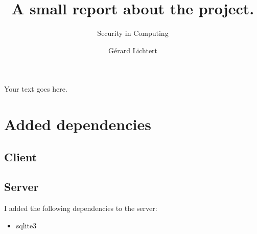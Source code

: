\documentclass{article}
\title{A small report about the project.}
\subtitle{Security in Computing}
\author{Gérard Lichtert}
\begin{document}
\maketitle

Your text goes here.


\tableofcontents

\section*{Added dependencies}
\subsection*{Client}
\subsection*{Server}
I added the following dependencies to the server:
\begin{itemize}
    \item sqlite3
\end{itemize}
\end{document}
